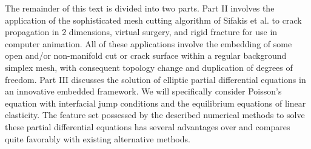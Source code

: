 The remainder of this text is divided into two parts. Part II involves the application of the sophisticated mesh cutting algorithm of Sifakis et al. \cite{Sifakis07} to crack propagation in $2$ dimensions, virtual surgery, and rigid fracture for use in computer animation. All of these applications involve the embedding of some open and/or non-manifold cut or crack surface within a regular background simplex mesh, with consequent topology change and duplication of degrees of freedom. Part III discusses the solution of elliptic partial differential equations in an innovative embedded framework. We will specifically consider Poisson's equation with interfacial jump conditions and the equilibrium equations of linear elasticity. The feature set possessed by the described numerical methods to solve these partial differential equations has several advantages over and compares quite favorably with existing alternative methods.
